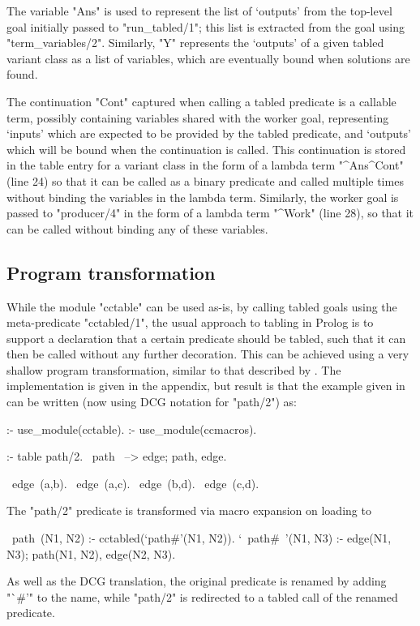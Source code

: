 The variable "Ans" is used 
to represent the list of `outputs' from the top-level goal initially passed
to "run_tabled/1"; this list is extracted from the goal using "term_variables/2".
Similarly, "Y" represents the `outputs' of a given tabled variant class as a list
of variables, which are eventually bound when solutions are found.

The continuation "Cont" captured when
calling a tabled predicate is a callable term, possibly containing variables shared
with the worker goal, representing `inputs' which are expected to be 
provided by the tabled predicate, and `outputs'
which will be bound when the continuation is called. This continuation is stored
in the table entry for a variant class in the form of a lambda term
"\Y^Ans^Cont" (line 24) so that it can be called as a binary predicate and called multiple times
without binding the variables in the lambda term. Similarly, the worker goal 
is passed to "producer/4" in the form of a lambda term "\Y^Work" (line 28),
so that it can be called without binding any of these variables.

\subsection{Program transformation}
While the module "cctable" can be used as-is, by calling tabled goals using the
meta-predicate "cctabled/1", the usual approach to tabling in Prolog is to support a
declaration that a certain predicate should be tabled, such that it can then be
called without any further decoration. This can be achieved using a very shallow
program transformation, similar to that described by \cite{DesouterVan-DoorenSchrijvers2015}.
The implementation is given in the appendix, but result is that the example given 
in  can be written (now using DCG notation for "path/2") as:
\begin{prolog-framed}
  :- use_module(cctable).
  :- use_module(ccmacros).

  :- table path/2.
  ~path~ --> edge; path, edge.

  ~edge~(a,b).  ~edge~(a,c).  ~edge~(b,d).  ~edge~(c,d).
\end{prolog-framed}
The "path/2" predicate is transformed via macro expansion on loading to
\begin{prolog}
  ~path~(N1, N2)     :- cctabled(`path#'(N1, N2)).
  `~path#~'(N1, N3) :- edge(N1, N3); path(N1, N2), edge(N2, N3).
\end{prolog}
As well as the DCG translation, the original predicate is renamed by
adding "`#'" to the name, while "path/2" is redirected to a tabled
call of the renamed predicate.



